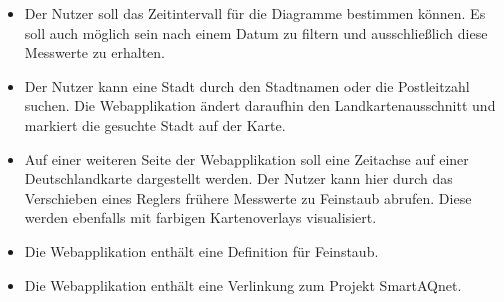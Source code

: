 \begin{itemize}
	\item Der Nutzer soll das Zeitintervall für die Diagramme bestimmen können. Es soll auch möglich sein nach einem Datum zu filtern und ausschließlich diese Messwerte zu erhalten.
	\item Der Nutzer kann eine Stadt durch den Stadtnamen oder die Postleitzahl suchen. Die Webapplikation ändert daraufhin den Landkartenausschnitt und markiert die gesuchte Stadt auf der Karte.
	\item Auf einer weiteren Seite der Webapplikation soll eine Zeitachse auf einer Deutschlandkarte dargestellt werden. Der Nutzer kann hier durch das Verschieben eines Reglers frühere Messwerte zu \gls{Feinstaub} abrufen. Diese werden ebenfalls mit farbigen \glspl{Kartenoverlay} visualisiert.
	\item Die Webapplikation enthält eine Definition für \gls{Feinstaub}.
	\item Die Webapplikation enthält eine Verlinkung zum Projekt \gls{SmartAQnet}. 
\end{itemize}
